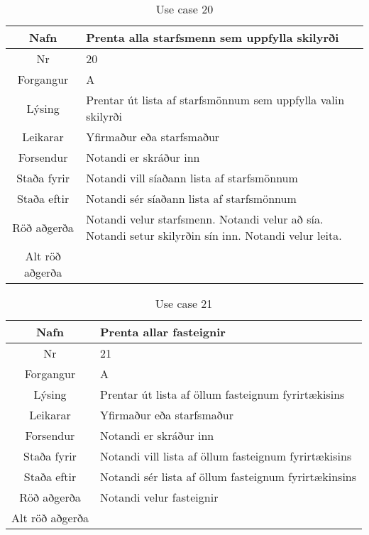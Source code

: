 \begin{table}[h!]\centering
\begin{tabular}{|c|p{10cm}|}
\hline
Nafn&Prenta alla starfsmenn sem uppfylla skilyrði\\
\hline
Nr&20\\
\hline
Forgangur&A\\
\hline
Lýsing&Prentar út lista af starfsmönnum sem uppfylla valin skilyrði\\
\hline
Leikarar&Yfirmaður eða starfsmaður\\
\hline
Forsendur&Notandi er skráður inn\\
\hline
Staða fyrir&Notandi vill síaðann lista af starfsmönnum\\
\hline
Staða eftir&Notandi sér síaðann lista af starfsmönnum\\
\hline
Röð aðgerða&Notandi velur starfsmenn. Notandi velur að sía. Notandi setur skilyrðin sín inn. Notandi velur leita.\\
\hline
Alt röð aðgerða&\\
\hline
\end{tabular}
\caption{Use case 20}\label{tab:use_case_20}
\end{table}
\begin{table}[h!]\centering
\begin{tabular}{|c|p{10cm}|}
\hline
Nafn&Prenta allar fasteignir\\
\hline
Nr&21\\
\hline
Forgangur&A\\
\hline
Lýsing&Prentar út lista af öllum fasteignum fyrirtækisins\\
\hline
Leikarar&Yfirmaður eða starfsmaður\\
\hline
Forsendur&Notandi er skráður inn\\
\hline
Staða fyrir&Notandi vill lista af öllum fasteignum fyrirtækisins\\
\hline
Staða eftir&Notandi sér lista af öllum fasteignum fyrirtækinsins\\
\hline
Röð aðgerða&Notandi velur fasteignir\\
\hline
Alt röð aðgerða&\\
\hline
\end{tabular}
\caption{Use case 21}\label{tab:use_case_21}
\end{table}
